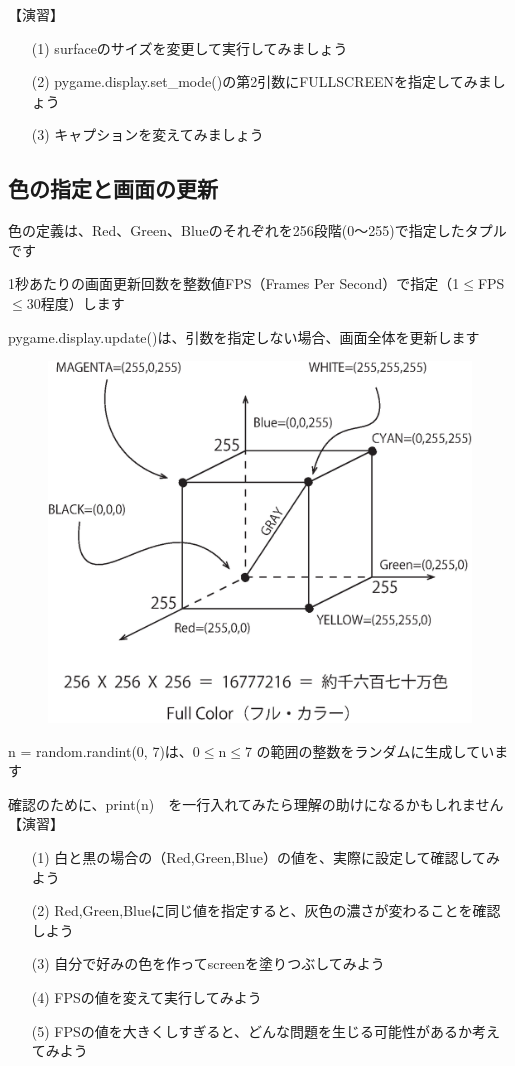 \documentclass[uplatex,a4paper,11pt,oneside,openany]{jsbook}
\begin{document}

【演習】
\begin{enumerate}
\item[(1)] surfaceのサイズを変更して実行してみましょう
\item[(2)] pygame.display.set\_mode()の第2引数にFULLSCREENを指定してみましょう
\item[(3)] キャプションを変えてみましょう
\end{enumerate}

\newpage

\subsection{色の指定と画面の更新}

色の定義は、Red、Green、Blueのそれぞれを256段階(0〜255)で指定したタプルです

1秒あたりの画面更新回数を整数値FPS（Frames Per Second）で指定（1$\le$FPS$\le$30程度）します

pygame.display.update()は、引数を指定しない場合、画面全体を更新します



\begin{figure}[h]
\vspace*{-11cm}
\hspace*{7.5cm}
\includegraphics[width=0.5\hsize]{./figure/pg02.eps}
\label{ラベル2}
\end{figure}

\vspace{3cm}

n = random.randint(0, 7)は、0$\le$n$\le$7 の範囲の整数をランダムに生成しています

確認のために、print(n)　を一行入れてみたら理解の助けになるかもしれません\\

【演習】
\begin{enumerate}
\item[(1)] 白と黒の場合の（Red,Green,Blue）の値を、実際に設定して確認してみよう
\item[(2)] Red,Green,Blueに同じ値を指定すると、灰色の濃さが変わることを確認しよう
\item[(3)] 自分で好みの色を作ってscreenを塗りつぶしてみよう
\item[(4)] FPSの値を変えて実行してみよう
\item[(5)] FPSの値を大きくしすぎると、どんな問題を生じる可能性があるか考えてみよう
\end{enumerate}
\end{document}
